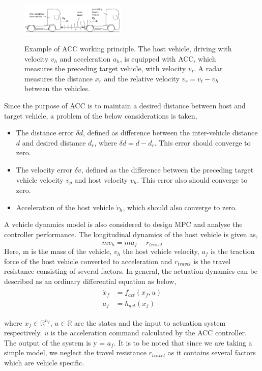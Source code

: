 \begin{figure}[h]
\centering
\includegraphics[width=0.45\textwidth]{img/trucks.png}\\
\caption{Example of ACC working principle. The host vehicle, driving with velocity $v_h$ and acceleration $a_h$, is equipped with ACC, which measures the preceding target vehicle, with velocity $v_t$. A radar measures the distance $x_r$ and the relative velocity $v_r=v_t-v_h$ between the vehicles. \cite{Elsevier}}
\label{fig:ACC_example}
\end{figure}

Since the purpose of ACC is to maintain a desired distance between host and target vehicle, a problem of the below considerations is taken,
\begin{itemize}
    \item The distance error $\delta d$, defined as difference between the inter-vehicle distance $d$ and desired distance $d_r$, where $\delta d = d - d_r$. This error should converge to zero.
    \item The velocity error $\delta v$, defined as the difference between the preceding target vehicle velocity $v_p$ and host velocity $v_h$. This error also should converge to zero.
    \item Acceleration of the host vehicle $\dot{v}_h$, which should also converge to zero.
\end{itemize}

A vehicle dynamics model is also considered to design MPC and analyse the controller performance. The longitudinal dynamics of the host vehicle is given as,
\[m\dot{v}_h = ma_f - r_{travel}\]
Here, m is the mass of the vehicle, $v_h$ the host vehicle velocity, $a_f$ is the traction force of the host vehicle converted to acceleration and $r_{travel}$ is the travel resistance consisting of several factors.
In general, the actuation dynamics can be described as an ordinary differential equation as below,
\begin{gather}
\begin{aligned}
\dot{x}_f &= f_{act}(x_f,u)\\
a_f &= h_{act}(x_f)
\end{aligned}
\end{gather}

where $x_f \in \mathbb{R} ^{n_f}$, $u \in \mathbb{R}$ are the states and the input to actuation system respectively. \textit{u} is the acceleration command calculated by the ACC controller. The output of the system is y = $a_f$. It is to be noted that since we are taking a simple model, we neglect the travel resistance $r_{travel}$ as it contains several factors which are vehicle specific. 

